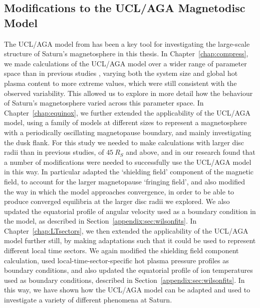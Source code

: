 \subsection{Modifications to the UCL/AGA Magnetodisc Model}
The UCL/AGA model from \citet{achilleos2010a} has been a key tool for investigating the large-scale structure of Saturn's magnetosphere in this thesis. In Chapter~\ref{chap:compress}, we made calculations of the UCL/AGA model over a wider range of parameter space than in previous studies \citep{achilleos2010a, achilleos2010b}, varying both the system size and global hot plasma content to more extreme values, which were still consistent with the observed variability. This allowed us to explore in more detail how the behaviour of Saturn's magnetosphere varied across this parameter space. In Chapter~\ref{chap:equinox}, we further extended the applicability of the UCL/AGA model, using a family of models at different sizes to represent a magnetosphere with a periodically oscillating magnetopause boundary, and mainly investigating the dusk flank. For this study we needed to make calculations with larger disc radii than in previous studies, of $\SI{45}{R_S}$ and above, and in our research found that a number of modifications were needed to successfully use the UCL/AGA model in this way. In particular adapted the `shielding field' component of the magnetic field, to account for the larger magnetopause `fringing field', and also modified the way in which the model approaches convergence, in order to be able to  produce converged equilibria at the larger disc radii we explored. We also updated the equatorial profile of angular velocity used as a boundary condition in the model, as described in Section~\ref{appendix:sec:wilsonfits}. In Chapter~\ref{chap:LTsectors}, we then extended the applicability of the  UCL/AGA model further still, by making adaptations such that it could be used to represent different local time sectors. We again modified the shielding field component calculation, used local-time-sector-specific hot plasma pressure profiles as boundary conditions, and also updated the equatorial profile of ion temperatures used as boundary conditions, described in Section~\ref{appendix:sec:wilsonfits}. In this way, we have shown how the UCL/AGA model can be adapted and used to investigate a variety of different phenomena at Saturn.

